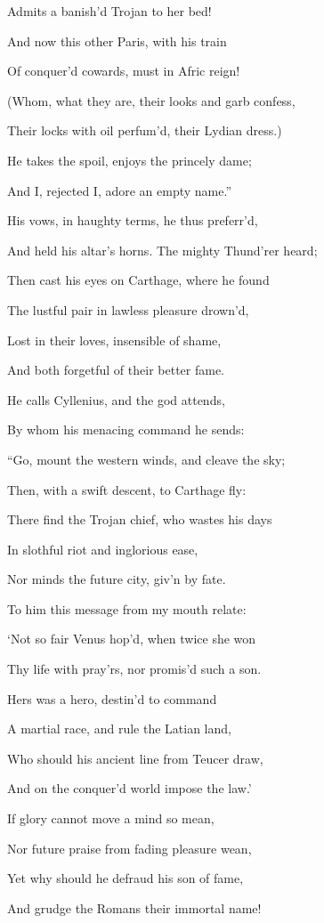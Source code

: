 Admits a banish’d Trojan to her bed!

And now this other Paris, with his train

Of conquer’d cowards, must in Afric reign!

(Whom, what they are, their looks and garb confess,

Their locks with oil perfum’d, their Lydian dress.)

He takes the spoil, enjoys the princely dame;

And I, rejected I, adore an empty name.”

His vows, in haughty terms, he thus preferr’d,

And held his altar’s horns. The mighty Thund’rer heard;

Then cast his eyes on Carthage, where he found

The lustful pair in lawless pleasure drown’d,

Lost in their loves, insensible of shame,

And both forgetful of their better fame.

He calls Cyllenius, and the god attends,

By whom his menacing command he sends:

“Go, mount the western winds, and cleave the sky;

Then, with a swift descent, to Carthage fly:

There find the Trojan chief, who wastes his days

In slothful riot and inglorious ease,

Nor minds the future city, giv’n by fate.

To him this message from my mouth relate:

‘Not so fair Venus hop’d, when twice she won

Thy life with pray’rs, nor promis’d such a son.

Hers was a hero, destin’d to command

A martial race, and rule the Latian land,

Who should his ancient line from Teucer draw,

And on the conquer’d world impose the law.’

If glory cannot move a mind so mean,

Nor future praise from fading pleasure wean,

Yet why should he defraud his son of fame,

And grudge the Romans their immortal name!

